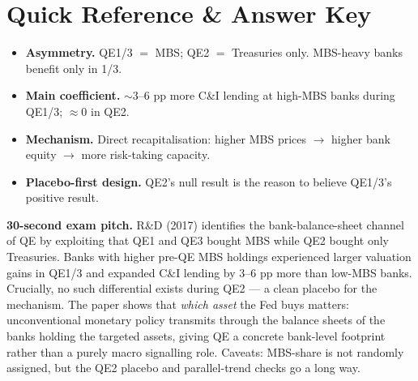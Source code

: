 \documentclass[11pt]{article}
\begin{document}
\section*{Quick Reference \& Answer Key}
\begin{answerbox}
\begin{itemize}
\item \textbf{Asymmetry.} QE1/3 $=$ MBS; QE2 $=$ Treasuries only. MBS-heavy banks benefit only in 1/3.
\item \textbf{Main coefficient.} $\sim$3--6 pp more C\&I lending at high-MBS banks during QE1/3; $\approx 0$ in QE2.
\item \textbf{Mechanism.} Direct recapitalisation: higher MBS prices $\to$ higher bank equity $\to$ more risk-taking capacity.
\item \textbf{Placebo-first design.} QE2's null result is the reason to believe QE1/3's positive result.
\end{itemize}
\end{answerbox}

\begin{keybox}
\textbf{30-second exam pitch.} R\&D (2017) identifies the bank-balance-sheet channel of QE by exploiting that QE1 and QE3 bought MBS while QE2 bought only Treasuries. Banks with higher pre-QE MBS holdings experienced larger valuation gains in QE1/3 and expanded C\&I lending by 3--6 pp more than low-MBS banks. Crucially, no such differential exists during QE2 --- a clean placebo for the mechanism. The paper shows that \emph{which asset} the Fed buys matters: unconventional monetary policy transmits through the balance sheets of the banks holding the targeted assets, giving QE a concrete bank-level footprint rather than a purely macro signalling role. Caveats: MBS-share is not randomly assigned, but the QE2 placebo and parallel-trend checks go a long way.
\end{keybox}
\end{document}
